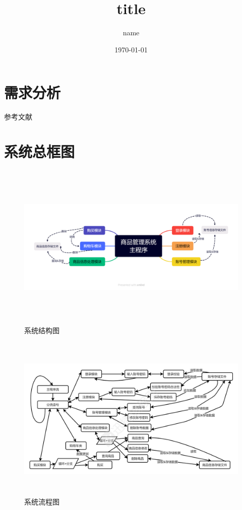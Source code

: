 \documentclass[a4paper]{article}
\title{title}
\author{name}
\date{\today}
\begin{document}
\maketitle
\begin{spacing}{1.2}%
    \tableofcontents
\end{spacing}
\thispagestyle{main}

\clearpage

\setcounter{page}{1}
\renewcommand{\thepage}{\arabic{page}}
\section{需求分析}\seccontent

参考文献\cite{badrinarayanan2016segnetdeepconvolutionalencoderdecoder}

\sectionbreak
\section{系统总框图}

\begin{figure}[htbp]
    \centering
    \includegraphics[width=\textwidth,height=8cm]{fig/struct.png}
    \caption{系统结构图}
\end{figure}

\begin{figure}[htbp]
    \centering
    \includegraphics[width=\textwidth,height=8cm]{fig/StructPic.png}
    \caption{系统流程图}
\end{figure}
\end{document}
